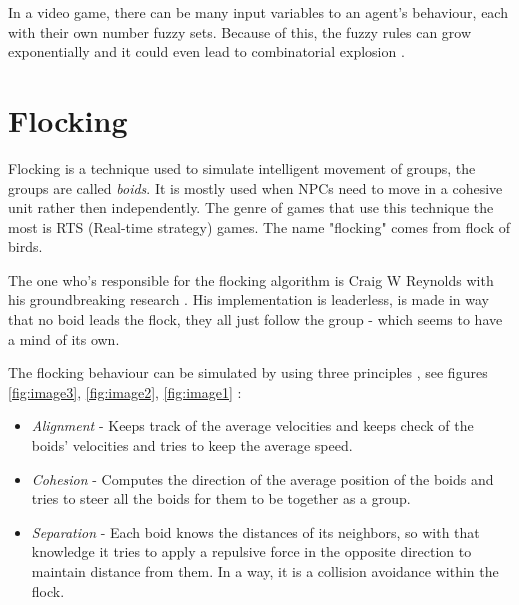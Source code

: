 \documentclass[a4paper, 12pt]{book}
\begin{document}
In a video game, there can be many input variables to an agent's behaviour, each with their own number fuzzy sets. Because of this, the fuzzy rules can grow exponentially and it could even lead to combinatorial explosion \cite{CombinatorialBombing}.

\section{Flocking}

Flocking is a technique used to simulate intelligent movement of groups, the groups are called \emph{boids}. It is mostly used when NPCs need to move in a cohesive unit rather then independently. The genre of games that use this technique the most is RTS (Real-time strategy) games. The name "flocking" comes from flock of birds.

The one who's responsible for the flocking algorithm is Craig W Reynolds with his groundbreaking research \cite{FlocksReynolds}. His implementation is leaderless, is made in way that no boid leads the flock, they all just follow the group - which seems to have a mind of its own.

The flocking behaviour can be simulated by using three principles \cite{FlockingBehaviour}, see figures \ref{fig:image3}, \ref{fig:image2}, \ref{fig:image1} \cite{WebsiteBoids}: 
\begin{itemize}
    \item \emph{Alignment} - Keeps track of the average velocities and keeps check of the boids' velocities and tries to keep the average speed.
    \item \emph{Cohesion} - Computes the direction of the average position of the boids and tries to steer all the boids for them to be together as a group.
    \item \emph{Separation} - Each boid knows the distances of its neighbors, so with that knowledge it tries to apply a repulsive force in the opposite direction to maintain distance from them. In a way, it is a collision avoidance within the flock.
\end{itemize}
\end{document}
